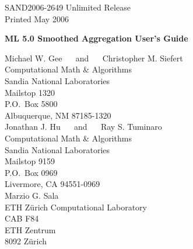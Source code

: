 \documentclass{article}[11pt]
\def\draft{%
\special{!userdict begin /bop-hook{gsave
200 30 translate 65 rotate
/Times-Roman findfont 216 scalefont setfont
0 0 moveto 0.9 setgray (DRAFT) show grestore}def end}
}
\begin{document}

\setcounter{page}{3}

\large


%
%
\begin{center}
SAND2006-2649
Unlimited Release \\
Printed May 2006
\end{center}

\vspace{0.2in}

\begin{center}
{\Large {\bf ML 5.0 Smoothed Aggregation User's Guide}}

\vspace*{0.8in}
Michael W. Gee $\quad$ and $\quad$
Christopher M. Siefert \\
Computational Math \& Algorithms \\
Sandia National Laboratories\\
Mailstop 1320 \\
P.O.~Box 5800 \\
Albuquerque, NM 87185-1320\\[10pt]
Jonathan J. Hu $\quad$ and $\quad$
Ray S. Tuminaro \\
Computational Math \& Algorithms \\
Sandia National Laboratories\\
Mailstop 9159 \\
P.O.~Box 0969 \\
Livermore, CA 94551-0969\\[10pt]
Marzio G. Sala \\
ETH Z\"urich Computational Laboratory\\
CAB F84\\
ETH Zentrum\\
8092 Z\"urich\\


\vspace*{1in}

\end{center}
\end{document}
